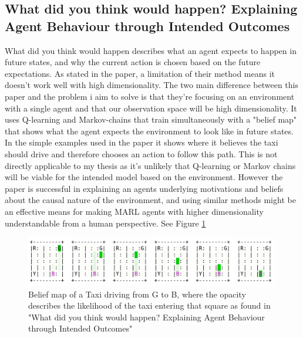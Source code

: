 \documentclass[UKenglish]{uiomasterthesis}
\begin{document}
\subsection{ What did you think would happen? Explaining Agent Behaviour through Intended Outcomes}
What did you think would happen describes what an agent expects to happen in future states, and why the current action is chosen based on the future expectations. As stated in the paper, a limitation of their method means it doesn't work well with high dimensionality. The two main difference between this paper and the problem i aim to solve is that they're focusing on an environment with a single agent and that our observation space will be high dimensionality. It uses Q-learning and Markov-chains that train simultaneously with a "belief map" that shows what the agent expects the environment to look like in future states. In the simple examples used in the paper it shows where it believes the taxi should drive and therefore chooses an action to follow this path. This is not directly applicable to my thesis as it's unlikely that Q-learning or Markov chains will be viable for the intended model based on the environment. However the paper is successful in explaining an agents underlying motivations and beliefs about the causal nature of the environment, and using similar methods might be an effective means for making MARL agents with higher dimensionality understandable from a human perspective. See Figure \ref{fig:taxi}

\begin{figure}[!ht]
	\includegraphics[width=\columnwidth]{images/merged_14_dqntaxi.png}
	\caption{Belief map of a Taxi driving from G to B, where the opacity describes the likelihood of the taxi entering that square as found in "What did you think would happen? Explaining Agent Behaviour through Intended Outcomes" \cite{yau2020did}}
	\label{fig:taxi}
\end{figure}
\end{document}
